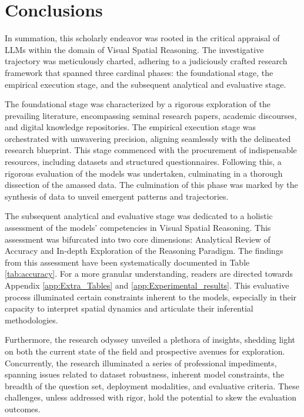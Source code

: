\documentclass[twocolumn,11pt]{report}
\begin{document}
\chapter{Conclusions}\label{chap:conclusions}
In summation, this scholarly endeavor was rooted in the critical appraisal of LLMs within the domain of Visual Spatial Reasoning. The investigative trajectory was meticulously charted, adhering to a judiciously crafted research framework that spanned three cardinal phases: the foundational stage, the empirical execution stage, and the subsequent analytical and evaluative stage.

The foundational stage was characterized by a rigorous exploration of the prevailing literature, encompassing seminal research papers, academic discourses, and digital knowledge repositories. The empirical execution stage was orchestrated with unwavering precision, aligning seamlessly with the delineated research blueprint. This stage commenced with the procurement of indispensable resources, including datasets and structured questionnaires. Following this, a rigorous evaluation of the models was undertaken, culminating in a thorough dissection of the amassed data. The culmination of this phase was marked by the synthesis of data to unveil emergent patterns and trajectories.

The subsequent analytical and evaluative stage was dedicated to a holistic assessment of the models' competencies in Visual Spatial Reasoning. This assessment was bifurcated into two core dimensions: Analytical Review of Accuracy and In-depth Exploration of the Reasoning Paradigm. The findings from this assessment have been systematically documented in Table \ref{tab:accuracy}. For a more granular understanding, readers are directed towards Appendix \ref{app:Extra_Tables} and \ref{app:Experimental_results}. This evaluative process illuminated certain constraints inherent to the models, especially in their capacity to interpret spatial dynamics and articulate their inferential methodologies.

Furthermore, the research odyssey unveiled a plethora of insights, shedding light on both the current state of the field and prospective avenues for exploration. Concurrently, the research illuminated a series of professional impediments, spanning issues related to dataset robustness, inherent model constraints, the breadth of the question set, deployment modalities, and evaluative criteria. These challenges, unless addressed with rigor, hold the potential to skew the evaluation outcomes.
\end{document}
